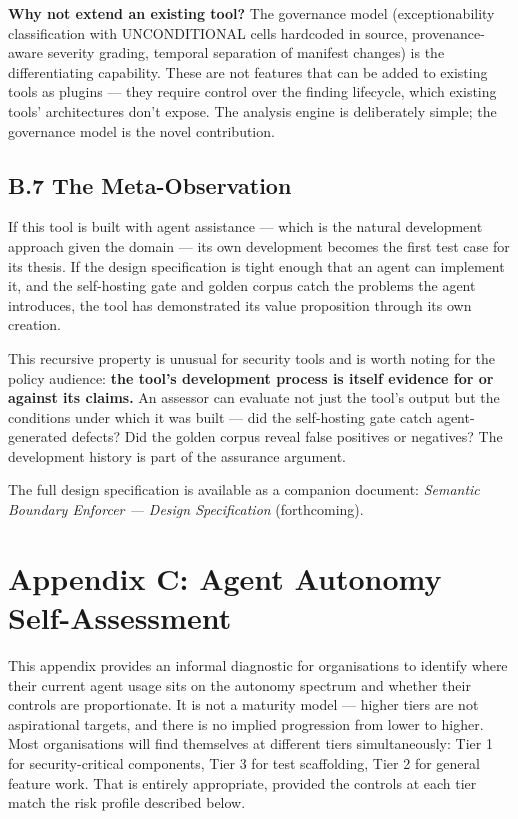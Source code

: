 \documentclass[a4paper,11pt]{report}
\begin{document}
\textbf{Why not extend an existing tool?} The governance model
(exceptionability classification with UNCONDITIONAL cells hardcoded in
source, provenance-aware severity grading, temporal separation of
manifest changes) is the differentiating capability. These are not
features that can be added to existing tools as plugins --- they require
control over the finding lifecycle, which existing tools' architectures
don't expose. The analysis engine is deliberately simple; the governance
model is the novel contribution.

\hypertarget{b.7-the-meta-observation}{%
\subsection{B.7 The Meta-Observation}\label{b.7-the-meta-observation}}

If this tool is built with agent assistance --- which is the natural
development approach given the domain --- its own development becomes
the first test case for its thesis. If the design specification is tight
enough that an agent can implement it, and the self-hosting gate and
golden corpus catch the problems the agent introduces, the tool has
demonstrated its value proposition through its own creation.

This recursive property is unusual for security tools and is worth
noting for the policy audience: \textbf{the tool's development process
is itself evidence for or against its claims.} An assessor can evaluate
not just the tool's output but the conditions under which it was built
--- did the self-hosting gate catch agent-generated defects? Did the
golden corpus reveal false positives or negatives? The development
history is part of the assurance argument.

The full design specification is available as a companion document:
\emph{Semantic Boundary Enforcer --- Design Specification}
(forthcoming).

\hypertarget{appendix-c-agent-autonomy-self-assessment}{%
\section{Appendix C: Agent Autonomy
Self-Assessment}\label{appendix-c-agent-autonomy-self-assessment}}

This appendix provides an informal diagnostic for organisations to
identify where their current agent usage sits on the autonomy spectrum
and whether their controls are proportionate. It is not a maturity model
--- higher tiers are not aspirational targets, and there is no implied
progression from lower to higher. Most organisations will find
themselves at different tiers simultaneously: Tier 1 for
security-critical components, Tier 3 for test scaffolding, Tier 2 for
general feature work. That is entirely appropriate, provided the
controls at each tier match the risk profile described below.
\end{document}
